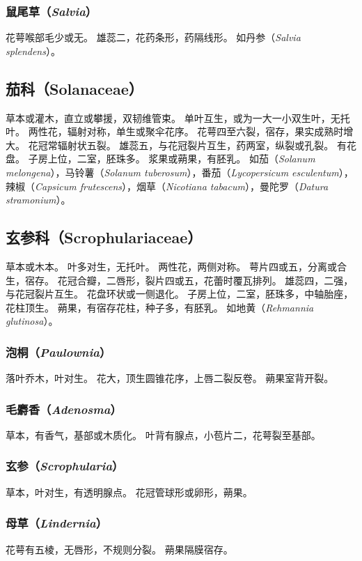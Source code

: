 \documentclass[11pt]{article}
\begin{document}
\begin{sloppypar}
\subsubsection{鼠尾草（\textit{Salvia}）}
花萼喉部毛少或无。
雄蕊二，花药条形，药隔线形。
如丹参（\textit{Salvia splendens}）。

\subsection{茄科（Solanaceae）}
草本或灌木，直立或攀援，双韧维管束。
单叶互生，或为一大一小双生叶，无托叶。
两性花，辐射对称，单生或聚伞花序。
花萼四至六裂，宿存，果实成熟时增大。
花冠常辐射状五裂。
雄蕊五，与花冠裂片互生，药两室，纵裂或孔裂。
有花盘。
子房上位，二室，胚珠多。
浆果或蒴果，有胚乳。
如茄（\textit{Solanum melongena}），马铃薯（\textit{Solanum tuberosum}），番茄（\textit{Lycopersicum esculentum}），辣椒（\textit{Capsicum frutescens}），烟草（\textit{Nicotiana tabacum}），曼陀罗（\textit{Datura stramonium}）。

\subsection{玄参科（Scrophulariaceae）}
草本或木本。
叶多对生，无托叶。
两性花，两侧对称。
萼片四或五，分离或合生，宿存。
花冠合瓣，二唇形，裂片四或五，花蕾时覆瓦排列。
雄蕊四，二强，与花冠裂片互生。
花盘环状或一侧退化。
子房上位，二室，胚珠多，中轴胎座，花柱顶生。
蒴果，有宿存花柱，种子多，有胚乳。
如地黄（\textit{Rehmannia glutinosa}）。

\subsubsection{泡桐（\textit{Paulownia}）}
落叶乔木，叶对生。
花大，顶生圆锥花序，上唇二裂反卷。
蒴果室背开裂。

\subsubsection{毛麝香（\textit{Adenosma}）}
草本，有香气，基部或木质化。
叶背有腺点，小苞片二，花萼裂至基部。

\subsubsection{玄参（\textit{Scrophularia}）}
草本，叶对生，有透明腺点。
花冠管球形或卵形，蒴果。

\subsubsection{母草（\textit{Lindernia}）}
花萼有五棱，无唇形，不规则分裂。
蒴果隔膜宿存。


\end{sloppypar}
\end{document}
